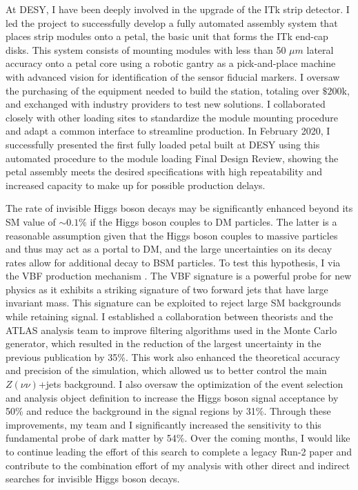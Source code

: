 \documentclass[a4paper]{article}
\begin{document}
At DESY, I have been deeply involved in the upgrade of the ITk strip detector\cite{ITKstrips}. I led the project to successfully develop a fully automated assembly system that places strip modules onto a petal, the basic unit that forms the ITk end-cap disks. This system consists of mounting modules with less than 50 $\mu m$ lateral accuracy onto a petal core using a robotic gantry as a pick-and-place machine with advanced vision for identification of the sensor fiducial markers. I oversaw the purchasing of the equipment needed to build the station, totaling over $\$200$k, and exchanged with industry providers to test new solutions. I collaborated closely with other loading sites to standardize the module mounting procedure and adapt a common interface to streamline production. In February 2020, I successfully presented the first fully loaded petal built at DESY using this automated procedure to the module loading Final Design Review, showing the petal assembly meets the desired specifications with high repeatability and increased capacity to make up for possible production delays.

\bigskip

The rate of invisible Higgs boson decays may be significantly enhanced beyond its SM value of $\sim0.1\%$ if the Higgs boson couples to DM particles.
The latter is a reasonable assumption given that the Higgs boson couples to massive particles and thus may act as a portal to DM, and the large uncertainties on its decay rates allow for additional decay to BSM particles. To test this hypothesis, I  via the VBF production mechanism \cite{vbfMET_CONF2020}. The VBF signature is a powerful probe for new physics as it exhibits a striking signature of two forward jets that have large invariant mass. This signature can be exploited to reject large SM backgrounds while retaining signal. I established a collaboration between theorists and the ATLAS analysis team to improve filtering algorithms used in the Monte Carlo generator, which resulted in the reduction of the largest uncertainty in the previous publication by 35\%. This work also enhanced the theoretical accuracy and precision of the simulation, which allowed us to better control the main $Z\left(\nu\nu\right)$+jets background.
I also oversaw the optimization of the event selection and analysis object definition to increase the Higgs boson signal acceptance by 50\% and reduce the background in the signal regions by 31\%. Through these improvements, my team and I significantly increased the sensitivity to this fundamental probe of dark matter by 54\%. Over the coming months, I would like to continue leading the effort of this search to complete a
legacy Run-2 paper and contribute to the combination effort of my analysis with other direct and indirect searches for invisible Higgs boson decays.
\end{document}
